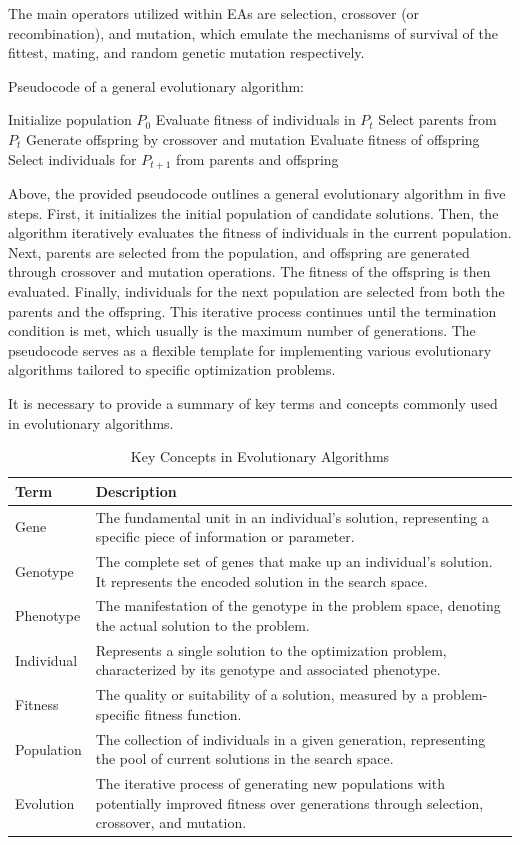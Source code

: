\documentclass[twoside]{ctuthesis}
\theoremstyle{plain}
\theoremstyle{definition}
\theoremstyle{note}
\begin{document}
The main operators utilized within EAs are selection, crossover (or recombination), and mutation, which emulate the mechanisms of survival of the fittest, mating, and random genetic mutation respectively.

Pseudocode of a general evolutionary algorithm:
\begin{algorithmic}[1]
	\State Initialize population $P_0$
	\State Evaluate fitness of individuals in $P_t$
	\State Select parents from $P_t$
	\State Generate offspring by crossover and mutation
	\State Evaluate fitness of offspring
	\State Select individuals for $P_{t+1}$ from parents and offspring
	\EndWhile
\end{algorithmic}

Above, the provided pseudocode outlines a general evolutionary algorithm in five steps. First, it initializes the initial population of candidate solutions. Then, the algorithm iteratively evaluates the fitness of individuals in the current population. Next, parents are selected from the population, and offspring are generated through crossover and mutation operations. The fitness of the offspring is then evaluated. Finally, individuals for the next population are selected from both the parents and the offspring. This iterative process continues until the termination condition is met, which usually is the maximum number of generations. The pseudocode serves as a flexible template for implementing various evolutionary algorithms tailored to specific optimization problems.

It is necessary to provide a summary of key terms and concepts commonly used in evolutionary algorithms.
\begin{table}[htbp]
	\caption{Key Concepts in Evolutionary Algorithms}
	\label{tab:key-concepts}
	\begin{tabularx}{\textwidth}{lX}
		\hline
		\textbf{Term} & \textbf{Description} \\
		\hline
		Gene & The fundamental unit in an individual's solution, representing a specific piece of information or parameter. \\
		Genotype & The complete set of genes that make up an individual's solution. It represents the encoded solution in the search space. \\
		Phenotype & The manifestation of the genotype in the problem space, denoting the actual solution to the problem. \\
		Individual & Represents a single solution to the optimization problem, characterized by its genotype and associated phenotype. \\
		Fitness & The quality or suitability of a solution, measured by a problem-specific fitness function. \\
		Population & The collection of individuals in a given generation, representing the pool of current solutions in the search space. \\
		Evolution & The iterative process of generating new populations with potentially improved fitness over generations through selection, crossover, and mutation. \\
		\hline
	\end{tabularx}
\end{table}
\end{document}
